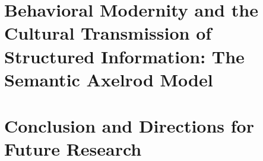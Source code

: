 \documentclass[letterpaper,12pt,final,openright,twoside]{memoir}
\begin{document}
\chapter{Behavioral Modernity and the Cultural Transmission of Structured Information:  The Semantic Axelrod Model}
\label{chap:semanticaxelrod-paper}


\chapter{Conclusion and Directions for Future Research}
\label{chap:conclusion}


\backmatter %






% 
\end{document}
